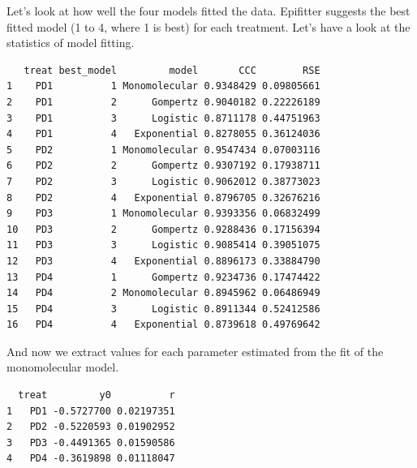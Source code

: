 \documentclass[
  letterpaper,
]{book}
\newenvironment{Shaded}{\begin{snugshade}}{\end{snugshade}}
\newcommand{\FunctionTok}[1]{\textcolor[rgb]{0.28,0.35,0.67}{#1}}
\newcommand{\NormalTok}[1]{\textcolor[rgb]{0.00,0.23,0.31}{#1}}
\newcommand{\SpecialCharTok}[1]{\textcolor[rgb]{0.37,0.37,0.37}{#1}}
\newcommand{\StringTok}[1]{\textcolor[rgb]{0.13,0.47,0.30}{#1}}
\begin{document}
Let's look at how well the four models fitted the data. Epifitter
suggests the best fitted model (1 to 4, where 1 is best) for each
treatment. Let's have a look at the statistics of model fitting.

\begin{Shaded}
\end{Shaded}

\begin{verbatim}
   treat best_model         model       CCC        RSE
1    PD1          1 Monomolecular 0.9348429 0.09805661
2    PD1          2      Gompertz 0.9040182 0.22226189
3    PD1          3      Logistic 0.8711178 0.44751963
4    PD1          4   Exponential 0.8278055 0.36124036
5    PD2          1 Monomolecular 0.9547434 0.07003116
6    PD2          2      Gompertz 0.9307192 0.17938711
7    PD2          3      Logistic 0.9062012 0.38773023
8    PD2          4   Exponential 0.8796705 0.32676216
9    PD3          1 Monomolecular 0.9393356 0.06832499
10   PD3          2      Gompertz 0.9288436 0.17156394
11   PD3          3      Logistic 0.9085414 0.39051075
12   PD3          4   Exponential 0.8896173 0.33884790
13   PD4          1      Gompertz 0.9234736 0.17474422
14   PD4          2 Monomolecular 0.8945962 0.06486949
15   PD4          3      Logistic 0.8911344 0.52412586
16   PD4          4   Exponential 0.8739618 0.49769642
\end{verbatim}

And now we extract values for each parameter estimated from the fit of
the monomolecular model.

\begin{Shaded}
\end{Shaded}

\begin{verbatim}
  treat         y0          r
1   PD1 -0.5727700 0.02197351
2   PD2 -0.5220593 0.01902952
3   PD3 -0.4491365 0.01590586
4   PD4 -0.3619898 0.01118047
\end{verbatim}
\end{document}
